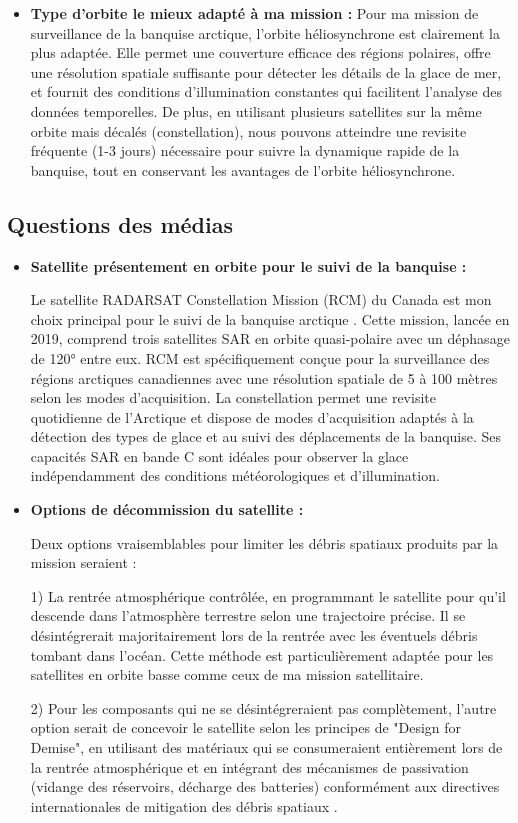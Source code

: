 \documentclass[12pt,a4paper]{article}
\begin{document}
\begin{itemize}[label=---]
    \item \textbf{Type d'orbite le mieux adapté à ma mission :} Pour ma mission de surveillance de la banquise arctique, l'orbite héliosynchrone est clairement la plus adaptée. Elle permet une couverture efficace des régions polaires, offre une résolution spatiale suffisante pour détecter les détails de la glace de mer, et fournit des conditions d'illumination constantes qui facilitent l'analyse des données temporelles. De plus, en utilisant plusieurs satellites sur la même orbite mais décalés (constellation), nous pouvons atteindre une revisite fréquente (1-3 jours) nécessaire pour suivre la dynamique rapide de la banquise, tout en conservant les avantages de l'orbite héliosynchrone.
\end{itemize}

\subsection{Questions des médias}
\begin{itemize}[label=---]
    \item \textbf{Satellite présentement en orbite pour le suivi de la banquise :}
    
    Le satellite RADARSAT Constellation Mission (RCM) du Canada est mon choix principal pour le suivi de la banquise arctique \citep{CSA2019, Zakhvatkina2022}. Cette mission, lancée en 2019, comprend trois satellites SAR en orbite quasi-polaire avec un déphasage de 120° entre eux. RCM est spécifiquement conçue pour la surveillance des régions arctiques canadiennes avec une résolution spatiale de 5 à 100 mètres selon les modes d'acquisition. La constellation permet une revisite quotidienne de l'Arctique et dispose de modes d'acquisition adaptés à la détection des types de glace et au suivi des déplacements de la banquise. Ses capacités SAR en bande C sont idéales pour observer la glace indépendamment des conditions météorologiques et d'illumination.
    
    \item \textbf{Options de décommission du satellite :}
    
    Deux options vraisemblables pour limiter les débris spatiaux produits par la mission seraient :
    
    1) La rentrée atmosphérique contrôlée, en programmant le satellite pour qu'il descende dans l'atmosphère terrestre selon une trajectoire précise. Il se désintégrerait majoritairement lors de la rentrée avec les éventuels débris tombant dans l'océan. Cette méthode est particulièrement adaptée pour les satellites en orbite basse comme ceux de ma mission satellitaire.
    
    2) Pour les composants qui ne se désintégreraient pas complètement, l'autre option serait de concevoir le satellite selon les principes de "Design for Demise", en utilisant des matériaux qui se consumeraient entièrement lors de la rentrée atmosphérique \citep{NASA2023, IADC2020} et en intégrant des mécanismes de passivation (vidange des réservoirs, décharge des batteries) conformément aux directives internationales de mitigation des débris spatiaux \citep{Dutta2022}.
\end{itemize}
\end{document}

